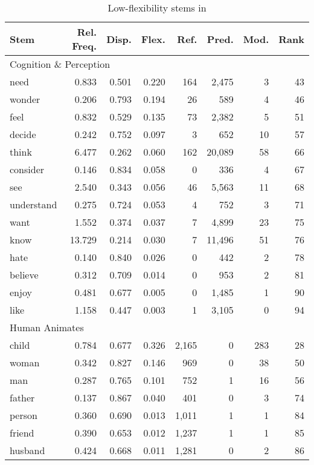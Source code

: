 \begin{table}
  \centering
  \caption{Low-flexibility stems in }
  \label{tab:English-low-flexibility}
  \begin{tabular}{ l r r r r r r r }
    \toprule
    Stem & Rel. Freq. & Disp. & Flex. & Ref. & Pred. & Mod. & Rank\\

    \midrule
    \multicolumn{6}{l}{Cognition \& Perception}\\
    \midrule
    need       &  0.833 & 0.501 & 0.220 & 164 &  2,475 &  3 & 43\\
    wonder     &  0.206 & 0.793 & 0.194 &  26 &    589 &  4 & 46\\
    feel       &  0.832 & 0.529 & 0.135 &  73 &  2,382 &  5 & 51\\
    decide     &  0.242 & 0.752 & 0.097 &   3 &    652 & 10 & 57\\
    think      &  6.477 & 0.262 & 0.060 & 162 & 20,089 & 58 & 66\\
    consider   &  0.146 & 0.834 & 0.058 &   0 &    336 &  4 & 67\\
    see        &  2.540 & 0.343 & 0.056 &  46 &  5,563 & 11 & 68\\
    understand &  0.275 & 0.724 & 0.053 &   4 &    752 &  3 & 71\\
    want       &  1.552 & 0.374 & 0.037 &   7 &  4,899 & 23 & 75\\
    know       & 13.729 & 0.214 & 0.030 &   7 & 11,496 & 51 & 76\\
    hate       &  0.140 & 0.840 & 0.026 &   0 &    442 &  2 & 78\\
    believe    &  0.312 & 0.709 & 0.014 &   0 &    953 &  2 & 81\\
    enjoy      &  0.481 & 0.677 & 0.005 &   0 &  1,485 &  1 & 90\\
    like       &  1.158 & 0.447 & 0.003 &   1 &  3,105 &  0 & 94\\

    \midrule
    \multicolumn{6}{l}{Human Animates}\\
    \midrule
    child   & 0.784 & 0.677 & 0.326 & 2,165 & 0 & 283 & 28\\
    woman   & 0.342 & 0.827 & 0.146 &   969 & 0 &  38 & 50\\
    man     & 0.287 & 0.765 & 0.101 &   752 & 1 &  16 & 56\\
    father  & 0.137 & 0.867 & 0.040 &   401 & 0 &   3 & 74\\
    person  & 0.360 & 0.690 & 0.013 & 1,011 & 1 &   1 & 84\\
    friend  & 0.390 & 0.653 & 0.012 & 1,237 & 1 &   1 & 85\\
    husband & 0.424 & 0.668 & 0.011 & 1,281 & 0 &   2 & 86\\


\end{tabular}
\end{table}
